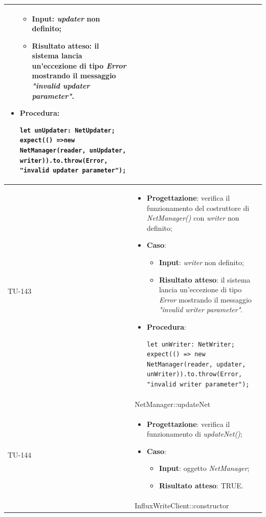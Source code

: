 \begin{longtable}{|C{1.5cm}|C{14.5cm}|}
\begin{itemize}
\begin{itemize}
		\item \textbf{Input}: \emph{updater} non definito;
		\item \textbf{Risultato atteso}: il sistema lancia un'eccezione di tipo \emph{Error} mostrando il messaggio \emph{"invalid updater parameter"}.
	\end{itemize}
	\item \textbf{Procedura}:
	\begin{lstlisting}
let unUpdater: NetUpdater;
expect(() =>new NetManager(reader, unUpdater, writer)).to.throw(Error, "invalid updater parameter");
	\end{lstlisting}
\end{itemize}\\
\hline
{TU-143} &
\begin{itemize}
	\item \textbf{Progettazione}: verifica il funzionamento del costruttore di \emph{NetManager()} con \emph{writer} non definito;
	\item \textbf{Caso}: 
	\begin{itemize}
		\item \textbf{Input}: \emph{writer} non definito;
		\item \textbf{Risultato atteso}: il sistema lancia un'eccezione di tipo \emph{Error} mostrando il messaggio \emph{"invalid writer parameter"}.
	\end{itemize}
	\item \textbf{Procedura}:
	\begin{lstlisting}
let unWriter: NetWriter;
expect(() => new NetManager(reader, updater, unWriter)).to.throw(Error, "invalid writer parameter");
	\end{lstlisting}
\end{itemize}\\
\hline
{} & NetManager::updateNet
\\ \hline
{TU-144} &
\begin{itemize}
	\item \textbf{Progettazione}: verifica il funzionamento di \emph{updateNet()};
	\item \textbf{Caso}: 
	\begin{itemize}
		\item \textbf{Input}: oggetto \emph{NetManager};
		\item \textbf{Risultato atteso}: TRUE.
	\end{itemize}
\end{itemize}\\
\hline
{} & InfluxWriteClient::constructor

\end{longtable}
